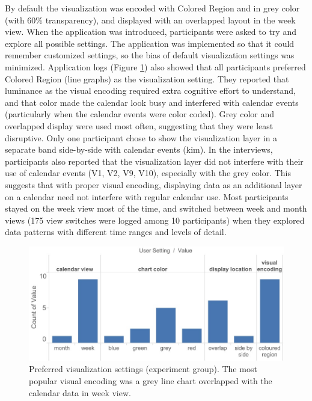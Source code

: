 \documentclass[12pt,oneside]{book}
\begin{document}
By default the visualization was encoded with Colored Region and in grey color (with 60\% transparency), and displayed with an overlapped layout in the week view.  When the application was introduced, participants were asked to try and explore all possible settings. The application was implemented so that it could remember customized settings, so the bias of default visualization settings was minimized. Application logs (Figure \ref{fig:log}) also showed that all participants preferred Colored Region (line graphs) as the visualization setting. They reported that luminance as the visual encoding required extra cognitive effort to understand, and that color made the calendar look busy and interfered with calendar events (particularly when the calendar events were color coded). Grey color and overlapped display were used most often, suggesting that they were least disruptive. Only one participant chose to show the visualization layer in a separate band side-by-side with calendar events (kim). In the interviews, participants also reported that the visualization layer did not interfere with their use of calendar events (V1, V2, V9, V10), especially with the grey color. This suggests that with proper visual encoding, displaying data as an additional layer on a calendar need not interfere with regular calendar use. Most participants stayed on the week view most of the time, and switched between week and month views (175 view switches were logged among 10 participants) when they explored data patterns with different time ranges and levels of detail.

\begin{figure}[h]
\centering
\includegraphics[width=\columnwidth]{figures/log}
\caption{Preferred visualization settings (experiment group). The most popular visual encoding was a grey line chart overlapped with the calendar data in week view.}
\label{fig:log}
\end{figure}

\end{document}
